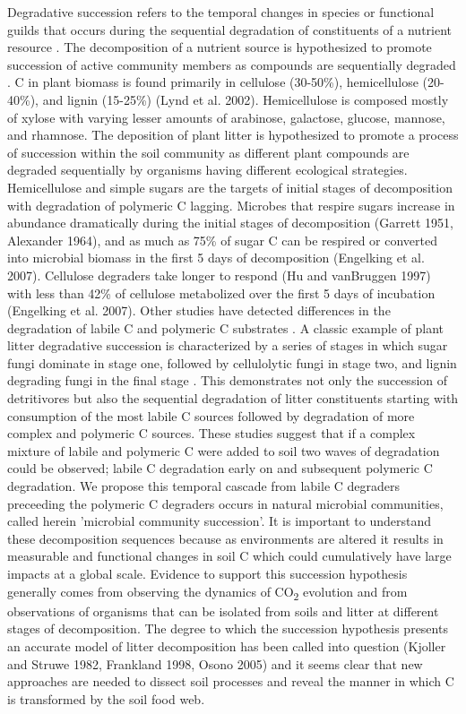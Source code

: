 Degradative succession refers to the temporal changes in species or functional guilds that occurs during the sequential degradation of constituents of a nutrient resource \cite{townsend2003essentials,Bastian_2009}. The decomposition of a nutrient source is hypothesized to promote succession of active community members as compounds are sequentially degraded \cite{Biddanda_1988}. C in plant biomass is found primarily in cellulose (30-50\%), hemicellulose (20-40\%), and lignin (15-25\%) (Lynd et al. 2002). Hemicellulose is composed mostly of xylose with varying lesser amounts of arabinose, galactose, glucose, mannose, and rhamnose. The deposition of plant litter is hypothesized to promote a process of succession within the soil community as different plant compounds are degraded sequentially by organisms having different ecological strategies. Hemicellulose and simple sugars are the targets of initial stages of decomposition with degradation of polymeric C lagging. Microbes that respire sugars increase in abundance dramatically during the initial stages of decomposition (Garrett 1951, Alexander 1964), and as much as 75\% of sugar C can be respired or converted into microbial biomass in the first 5 days of decomposition (Engelking et al. 2007). Cellulose degraders take longer to respond (Hu and vanBruggen 1997) with less than 42\% of cellulose metabolized over the first 5 days of incubation (Engelking et al. 2007). Other studies have detected differences in the degradation of labile C and polymeric C substrates \cite{Engelking_2007,Anderson_1973,Stotzky_1961,Alden_2001,Furukawa_1996,Fontaine_2003,Blagodatskaya_2007,Jenkins_2010,Rui_2009,Fierer_2010}. A classic example of plant litter degradative succession is characterized by a series of stages in which sugar fungi dominate in stage one, followed by cellulolytic fungi in stage two, and lignin degrading fungi in the final stage \cite{Gessner_2010}. This demonstrates not only the succession of detritivores but also the sequential degradation of litter constituents starting with consumption of the most labile C sources followed by degradation of more complex and polymeric C sources. These studies suggest that if a complex mixture of labile and polymeric C were added to soil two waves of degradation could be observed; labile C degradation early on and subsequent polymeric C degradation. We propose this temporal cascade from labile C degraders preceeding the polymeric C degraders occurs in natural microbial communities, called herein 'microbial community succession'. It is important to understand these decomposition sequences because as environments are altered it results in measurable and functional changes in soil C \cite{Grandy_2008} which could cumulatively have large impacts at a global scale.  
Evidence to support this succession hypothesis generally comes from observing the dynamics of CO\textsubscript{2} evolution and from observations of organisms that can be isolated from soils and litter at different stages of decomposition. The degree to which the succession hypothesis presents an accurate model of litter decomposition has been called into question (Kjoller and Struwe 1982, Frankland 1998, Osono 2005) and it seems clear that new approaches are needed to dissect soil processes and reveal the manner in which C is transformed by the soil food web.

